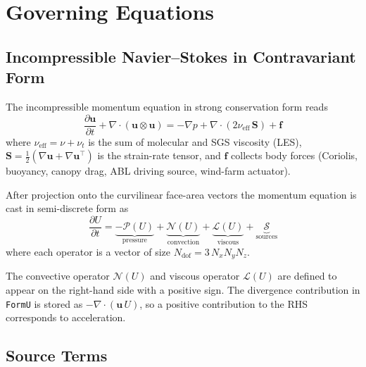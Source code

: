 \documentclass[12pt,a4paper]{article}
\newcommand{\bu}{\bm{u}}
\newcommand{\cN}{\mathcal{N}}
\newcommand{\cL}{\mathcal{L}}
\newcommand{\cP}{\mathcal{P}}
\newcommand{\cS}{\mathcal{S}}
\newcommand{\ddt}[1]{\dfrac{\partial #1}{\partial t}}
\begin{document}
	\section{Governing Equations}
	
	\subsection{Incompressible Navier--Stokes in Contravariant Form}
	
	The incompressible momentum equation in strong conservation form reads
	\begin{equation}
		\ddt{\bu} + \nabla\cdot(\bu\otimes\bu)
		= -\nabla p + \nabla\cdot(2\nu_\text{eff}\,\mathbf{S})
		+ \bm{f}
		\label{eq:NS}
	\end{equation}
	where $\nu_\text{eff} = \nu + \nu_t$ is the sum of molecular and SGS
	viscosity (LES), $\mathbf{S}=\tfrac{1}{2}(\nabla\bu+\nabla\bu^\top)$
	is the strain-rate tensor, and $\bm{f}$ collects body forces
	(Coriolis, buoyancy, canopy drag, ABL driving source, wind-farm
	actuator).
	
	After projection onto the curvilinear face-area vectors the momentum
	equation is cast in semi-discrete form as
	\begin{equation}
		\boxed{
			\ddt{U} = \underbrace{-\cP(U)}_{\text{pressure}}
			+ \underbrace{\cN(U)}_{\text{convection}}
			+ \underbrace{\cL(U)}_{\text{viscous}}
			+ \underbrace{\cS}_{\text{sources}}
		}
		\label{eq:semidiscrete}
	\end{equation}
	where each operator is a vector of size $N_\text{dof}=3\,N_x N_y N_z$.
	
	\begin{notebox}
		The convective operator $\cN(U)$ and viscous operator $\cL(U)$
		are defined to appear on the right-hand side with a positive sign.
		The divergence contribution in \texttt{FormU} is stored as
		$-\nabla\cdot(\bu\,U)$, so a positive contribution to the RHS
		corresponds to acceleration.
	\end{notebox}
	
	\subsection{Source Terms}
	
\end{document}
